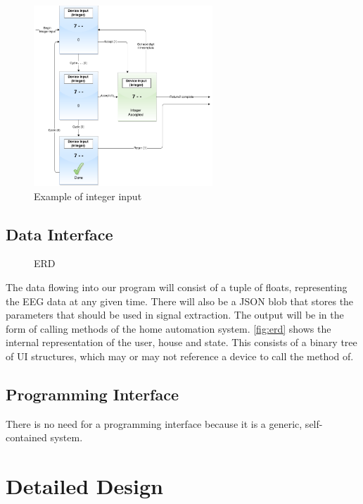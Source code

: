 \documentclass{article}
\begin{document}
\begin{figure}[h!]
	
	\centering
	\includegraphics[width=0.6\textwidth]{IntegerInput}
	\caption{Example of integer input}
	\label{fig:integerInput}
\end{figure}





\subsection{Data Interface}
\begin{figure}[h!]

  \centering
  \resizebox{\textwidth}{!}{
        
    }
   \caption{ERD}
   	\label{fig:erd}
\end{figure}

The data flowing into our program will consist of a tuple of floats,
representing the EEG data at any given time. There will also be a JSON blob
that stores the parameters that should be used in signal extraction. The
output will be in the form of calling methods of the home automation system.
\autoref{fig:erd} shows the internal representation of the user, house and
state. This consists of a binary tree of UI structures, which may or may not
reference a device to call the method of.

\subsection{Programming Interface} 
There is no need for a programming interface because it is a generic, self-contained system.

\newpage

\section{Detailed Design}
\end{document}
